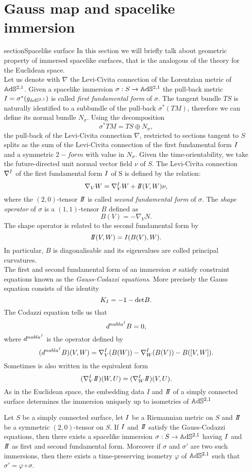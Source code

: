 \chapter{Gauss map and spacelike immersion}

section{Spacelike surface}
In this section we will briefly talk about geometric property of immersed spacelike surfaces, that is the analogous of the theory for the Euclidean space.\\
Let us denote with $\nabla$ the Levi-Civita connection of the Lorentzian metric of $\mathbb{A}\mathrm{d}\mathbb{S}^{2,1}$. Given a spacelike immersion $\sigma: S\to\mathbb{A}\mathrm{d}\mathbb{S}^{2,1}$ the pull-back metric $I = \sigma^*(g_{\mathbb{A}\mathrm{d}\mathbb{S}^{2,1}})$ is called \textit{first fundamental form} of $\sigma$.
The tangent bundle $TS$ is naturally identified to a subbundle of the pull-back $\sigma^*(TM)$, therefore we can define its normal bundle $N_\sigma$. Using the decomposition
\[
    \sigma^* TM = TS \oplus N_\sigma,
\]
the pull-back of the Levi-Civita connection $\nabla$, restricted to sections tangent to $S$ splits as the sum of the Levi-Civita connection of the first fundamental form $I$ and a symmetric $2-form$ with value in $N_\sigma$. Given the time-orientability, we take the future-directed unit normal vector field $\nu$ of $S$. The Levi-Civita connection $\nabla^I$ of the first fundamental form $I$ of S is defined by the relation:
\[
    \nabla_V W= \nabla^\I_V W + \II(V,W)\nu,
\] 
where the $(2,0)$-tensor $\II$ is called \textit{second fundamental form} of $\sigma$. The \textit{shape  operator} of $\sigma$ is a $(1,1)$-tensor $B$ defined as
\[
    B(V) = - \nabla_V N.
\]
The shape operator is related to the second fundamental form by
\[
    \II(V,W) = \I(B(V),W).
\]
In particular, $B$ is diagonalisable and its eigenvalues are colled principal curvatures.\\
The first and second fundamental form of an immersion $\sigma$ satisfy constraint equations known as the \textit{Gauss-Codazzi equations}. More precisely the Gauss equation consists of the identity
\[
    K_I = -1 - \text{det}B.
\]
The Codazzi equation tells us that
\[
    d^{nabla^I}B=0,
\]
where $d^{nabla^I}$ is the operator defined by
\[
    (d^{nabla^I}B)(V,W) = \nabla^I_V(B(W)) - \nabla^I_W(B(V)) - B([V,W]).
\]
Sometimes is also written in the equivalent form 
\[
    (\nabla^\I_V \II)(W,U) = (\nabla^\I_W \II)(V,U).
\]
As in the Euclidean space, the embedding data $I$ and $\II$ of a simply connected surface determines the immersion uniquely up to isometries of $\mathbb{A}\mathrm{d}\mathbb{S}^{2,1}$
\begin{theorem}\label{thm:immersion of simply connected surface}
    Let $S$ be a simply connected surface, let $I$ be a Riemannian metric on $S$ and $\II$ be a symmetric $(2,0)$-tensor on $S$. If $I$ and $\II$ satisfy the Gauss-Codazzi equations, then there exists a spacelike immersion $\sigma:S \to\mathbb{A}\mathrm{d}\mathbb{S}^{2,1}$ having $I$ and $\II$ as first and second fundamental form. Moreover if $\sigma$ and $\sigma'$ are two such immersions, then there exists a time-preserving isometry $\varphi$ of $\mathbb{A}\mathrm{d}\mathbb{S}^{2,1}$ such that $\sigma' = \varphi \circ \sigma$.
\end{theorem}

